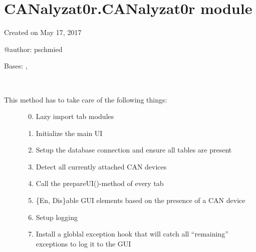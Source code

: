 \documentclass[letterpaper,10pt,english]{sphinxmanual}
\begin{document}
\section{CANalyzat0r.CANalyzat0r module}
\label{\detokenize{src:canalyzat0r-canalyzat0r-module}}\label{\detokenize{src:module-src.CANalyzat0r}}
Created on May 17, 2017

@author: pschmied

\begin{fulllineitems}
\label{\detokenize{src:src.CANalyzat0r.MainWindow}}
Bases: , {\hyperref[\detokenize{src.ui:src.ui.mainWindow.Ui_CANalyzatorMainWindow}]{}}

\begin{fulllineitems}
\label{\detokenize{src:src.CANalyzat0r.MainWindow.__init__}}~\begin{description}
\item[{This method has to take care of the following things:}] \leavevmode\begin{enumerate}
\setcounter{enumi}{-1}
\item {} 
Lazy import tab modules

\item {} 
Initialize the main UI

\item {} 
Setup the database connection and ensure all tables are present

\item {} 
Detect all currently attached CAN devices

\item {} 
Call the prepareUI()-method of every tab

\item {} 
\{En, Dis\}able GUI elements based on the presence of a CAN device

\item {} 
Setup logging

\item {} 
Install a globlal exception hook that will catch all “remaining” exceptions
to log it to the GUI


\end{enumerate}
\end{description}
\end{fulllineitems}
\end{fulllineitems}
\end{document}
